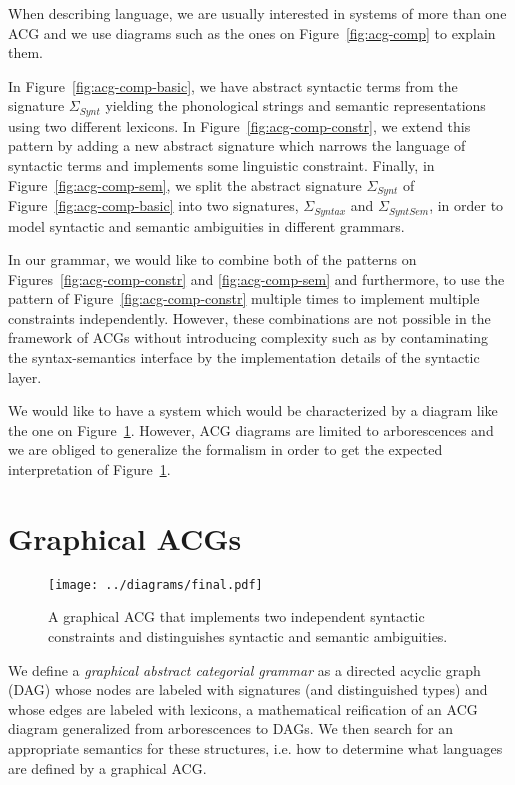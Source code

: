 \documentclass[twocolumn]{article}
\begin{document}
When describing language, we are usually interested in systems of more
than one ACG and we use diagrams such as the ones on
Figure~\ref{fig:acg-comp} to explain them.

In Figure~\ref{fig:acg-comp-basic}, we have abstract syntactic terms
from the signature $\Sigma_{Synt}$ yielding the phonological strings and
semantic representations using two different lexicons. In
Figure~\ref{fig:acg-comp-constr}, we extend this pattern by adding a new
abstract signature which narrows the language of syntactic terms and
implements some linguistic constraint. Finally, in
Figure~\ref{fig:acg-comp-sem}, we split the abstract signature
$\Sigma_{Synt}$ of Figure~\ref{fig:acg-comp-basic} into two signatures,
$\Sigma_{Syntax}$ and $\Sigma_{SyntSem}$, in order to model syntactic
and semantic ambiguities in different grammars.

In our grammar, we would like to combine both of the patterns on
Figures~\ref{fig:acg-comp-constr} and \ref{fig:acg-comp-sem} and
furthermore, to use the pattern of Figure~\ref{fig:acg-comp-constr}
multiple times to implement multiple constraints independently. However,
these combinations are not possible in the framework of ACGs without
introducing complexity such as by contaminating the syntax-semantics
interface by the implementation details of the syntactic layer.

We would like to have a system which would be characterized by a diagram
like the one on Figure~\ref{fig:gacg}. However, ACG diagrams are limited
to arborescences and we are obliged to generalize the formalism in order
to get the expected interpretation of Figure~\ref{fig:gacg}.

\section{Graphical ACGs}

\begin{figure}
  \centering
  \texttt{[image: ../diagrams/final.pdf]}
  \caption{{\label{fig:gacg} A graphical ACG that implements two
      independent syntactic constraints and distinguishes syntactic and
      semantic ambiguities.}}
\end{figure}

We define a \emph{graphical abstract categorial grammar} as a directed
acyclic graph (DAG) whose nodes are labeled with signatures (and
distinguished types) and whose edges are labeled with lexicons, a
mathematical reification of an ACG diagram generalized from
arborescences to DAGs. We then search for an appropriate semantics for
these structures, i.e. how to determine what languages are defined by a
graphical ACG.
\end{document}

